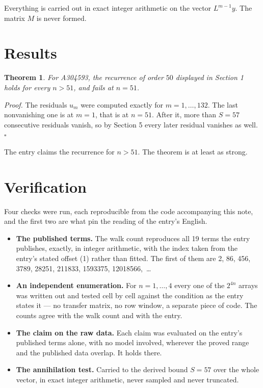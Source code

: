 \documentclass[11pt]{article}
\newtheorem{theorem}{Theorem}
\theoremstyle{definition}
\begin{document}
Everything is carried out in exact integer arithmetic on the vector $L^{m-1}y$. The matrix $M$ is never formed.

\section{Results}

\begin{theorem} For A304593, the recurrence of order $50$ displayed in Section 1 holds for every $n > 51$, and fails at $n = 51$.\end{theorem}

{\itshape Proof.} The residuals $u_m$ were computed exactly for $m = 1,\dots,132$. The last nonvanishing one is at $m = 1$, that is at $n = 51$. After it, more than $S = 57$ consecutive residuals vanish, so by Section 5 every later residual vanishes as well. $\square$

The entry claims the recurrence for $n > 51$. The theorem is at least as strong.

\section{Verification}

Four checks were run, each reproducible from the code accompanying this note, and the first two are what pin the reading of the entry's English.

\begin{itemize}

\item {\bfseries The published terms.} The walk count reproduces all 19 terms the entry publishes, exactly, in integer arithmetic, with the index taken from the entry's stated offset (1) rather than fitted. The first of them are 2, 86, 456, 3789, 28251, 211833, 1593375, 12018566,~\dots

\item {\bfseries An independent enumeration.} For $n = 1,\dots,4$ every one of the $2^{4n}$ arrays was written out and tested cell by cell against the condition as the entry states it --- no transfer matrix, no row window, a separate piece of code. The counts agree with the walk count and with the entry.

\item {\bfseries The claim on the raw data.} Each claim was evaluated on the entry's published terms alone, with no model involved, wherever the proved range and the published data overlap. It holds there.

\item {\bfseries The annihilation test.} Carried to the derived bound $S = 57$ over the whole vector, in exact integer arithmetic, never sampled and never truncated.

\end{itemize}
\end{document}
